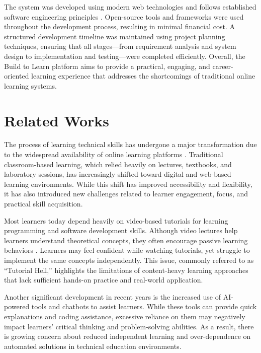 \documentclass[final,3p,times,twocolumn]{elsarticle}
\begin{document}
The system was developed using modern web technologies and follows established software engineering principles \cite{pressman2014software}. Open-source tools and frameworks were used throughout the development process, resulting in minimal financial cost. A structured development timeline was maintained using project planning techniques, ensuring that all stages—from requirement analysis and system design to implementation and testing—were completed efficiently. Overall, the Build to Learn platform aims to provide a practical, engaging, and career-oriented learning experience that addresses the shortcomings of traditional online learning systems.



\section{Related Works}

The process of learning technical skills has undergone a major transformation due to the widespread availability of online learning platforms \cite{dabbagh2005online,education2022digital}. Traditional classroom-based learning, which relied heavily on lectures, textbooks, and laboratory sessions, has increasingly shifted toward digital and web-based learning environments. While this shift has improved accessibility and flexibility, it has also introduced new challenges related to learner engagement, focus, and practical skill acquisition.

Most learners today depend heavily on video-based tutorials for learning programming and software development skills. Although video lectures help learners understand theoretical concepts, they often encourage passive learning behaviors \cite{ehlers2011quality}. Learners may feel confident while watching tutorials, yet struggle to implement the same concepts independently. This issue, commonly referred to as ``Tutorial Hell,'' highlights the limitations of content-heavy learning approaches that lack sufficient hands-on practice and real-world application.

Another significant development in recent years is the increased use of AI-powered tools and chatbots to assist learners. While these tools can provide quick explanations and coding assistance, excessive reliance on them may negatively impact learners' critical thinking and problem-solving abilities. As a result, there is growing concern about reduced independent learning and over-dependence on automated solutions in technical education environments.
\end{document}
